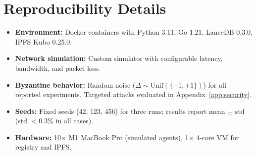 \section{Reproducibility Details}

\label{app:reproducibility}

\begin{itemize}[leftmargin=1.5em]
    \item \textbf{Environment:} Docker containers with Python 3.11, Go 1.21,
          LanceDB 0.3.0, IPFS Kubo 0.25.0.
    \item \textbf{Network simulation:} Custom simulator with configurable
          latency, bandwidth, and packet loss.
    \item \textbf{Byzantine behavior:} Random noise ($\Delta \sim \text{Unif}(\{-1,+1\})$)
          for all reported experiments. Targeted attacks evaluated in
          Appendix~\ref{app:security}.
    \item \textbf{Seeds:} Fixed seeds (42, 123, 456) for three runs; results
          report mean $\pm$ std (std $< 0.3\%$ in all cases).
    \item \textbf{Hardware:} 10$\times$ M1 MacBook Pro (simulated agents),
          1$\times$ 4-core VM for registry and IPFS.
\end{itemize}

